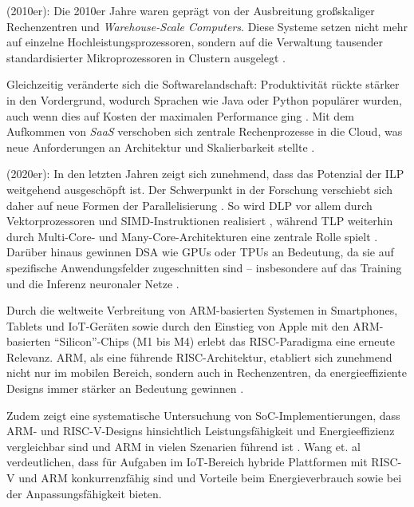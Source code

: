 (2010er): Die 2010er Jahre waren geprägt von der Ausbreitung großskaliger Rechenzentren und \textit{Warehouse-Scale Computers}. Diese Systeme setzen nicht mehr auf einzelne Hochleistungsprozessoren, sondern auf die Verwaltung tausender standardisierter Mikroprozessoren in Clustern ausgelegt \parencites[S.~6]{hennessy_computer_2011}[S.~158]{kanev_profiling_2015}[S.~29]{mars_heterogeneity_2011}.

Gleichzeitig veränderte sich die Softwarelandschaft: Produktivität rückte stärker in den Vordergrund, wodurch Sprachen wie Java oder Python populärer wurden, auch wenn dies auf Kosten der maximalen Performance ging \parencite[S.~2]{hennessy_computer_2011}. Mit dem Aufkommen von \textit{\ac{SaaS}} verschoben sich zentrale Rechenprozesse in die Cloud, was neue Anforderungen an Architektur und Skalierbarkeit stellte \parencites[S.~158]{kanev_profiling_2015}[S.~29]{mars_heterogeneity_2011}.

(2020er): In den letzten Jahren zeigt sich zunehmend, dass das Potenzial der \ac{ILP} weitgehend ausgeschöpft ist. Der Schwerpunkt in der Forschung verschiebt sich daher auf neue Formen der Parallelisierung \parencite[S.~10]{hennessy_computer_2019}. So wird \ac{DLP} vor allem durch Vektorprozessoren und \ac{SIMD}-Instruktionen realisiert \parencite[S.~1]{israel_high_2024}, während \ac{TLP} weiterhin durch Multi-Core- und Many-Core-Architekturen eine zentrale Rolle spielt \parencite[S.~10]{hennessy_computer_2019}. Darüber hinaus gewinnen \ac{DSA} wie GPUs oder \acp{TPU} an Bedeutung, da sie auf spezifische Anwendungsfelder zugeschnitten sind – insbesondere auf das Training und die Inferenz neuronaler Netze \parencite[S.~10]{hennessy_computer_2019}.

Durch die weltweite Verbreitung von ARM-basierten Systemen in Smartphones, Tablets und \acs{IoT}-Geräten sowie durch den Einstieg von Apple mit den ARM-basierten \enquote{Silicon}-Chips (M1 bis M4) erlebt das \ac{RISC}-Paradigma eine erneute Relevanz. ARM, als eine führende \ac{RISC}-Architektur, etabliert sich zunehmend nicht nur im mobilen Bereich, sondern auch in Rechenzentren, da energieeffiziente Designs immer stärker an Bedeutung gewinnen \parencites[S.~817]{rahman_redefining_2024}[S.~1]{hubner_apple_2025} .

Zudem zeigt eine systematische Untersuchung von \acs{SoC}-Implementierungen, dass ARM- und RISC-V-Designs hinsichtlich Leistungsfähigkeit und Energieeffizienz vergleichbar sind und ARM in vielen Szenarien führend ist \parencite[S.~12771]{suarez_comprehensive_2024}. Wang et. al~\cite{wang_fann--mcu_2020} verdeutlichen, dass für Aufgaben im \acs{IoT}-Bereich hybride Plattformen mit RISC-V und ARM konkurrenzfähig sind und Vorteile beim Energieverbrauch sowie bei der Anpassungsfähigkeit bieten. 

